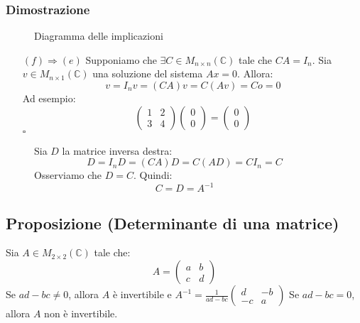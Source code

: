 \documentclass[a4paper]{article}
\theoremstyle{break}
\theoremstyle{break}
\theoremstyle{break}
\theoremstyle{break}
\begin{document}
\subsubsection{Dimostrazione}
\begin{figure}[H]
  \centering
  \caption{Diagramma delle implicazioni}
\end{figure}
\begin{itemize}
  \item[\( (f) \Rightarrow (e) \) ] Supponiamo che \( \exists C \in M_{n \times n}(\mathbb{C}) \)
    tale che \( CA = I_n \). Sia \( v \in  M_{n \times 1}(\mathbb{C}) \) una soluzione
    del sistema \( Ax = 0 \). Allora: 
    \[ v = I_nv = (CA)v = C(Av) = Co = 0 \]
    Ad esempio:
    \[
    \begin{pmatrix} 
      1 & 2\\
      3 & 4
    \end{pmatrix} 
    \begin{pmatrix} 0\\0 \end{pmatrix} 
    =
    \begin{pmatrix} 0\\0 \end{pmatrix}
    \] 
    \( \square \) 
\end{itemize}

\begin{figure}[H]
  \begin{define}
    Sia \( D \) la matrice inversa destra:
    \[
    D = I_nD = (CA)D = C(AD) = CI_n = C
    \] 
    Osserviamo che \( D = C \). Quindi:
    \[
      C = D = A^{-1}
    \] 
  \end{define}
\end{figure}

\subsection{Proposizione (Determinante di una matrice)}
Sia \( A \in M_{2 \times 2}(\mathbb{C}) \) tale che:
\[
A = \begin{pmatrix} 
  a & b\\
  c & d
\end{pmatrix} 
\] 
Se \( ad-bc \neq 0 \), allora \( A \) è invertibile e \( A^{-1} = \frac{1}{ad-bc} \begin{pmatrix} 
  d & -b\\
  -c & a
\end{pmatrix}  \) 
Se \( ad-bc = 0 \), allora \( A \) non è invertibile.
\end{document}
